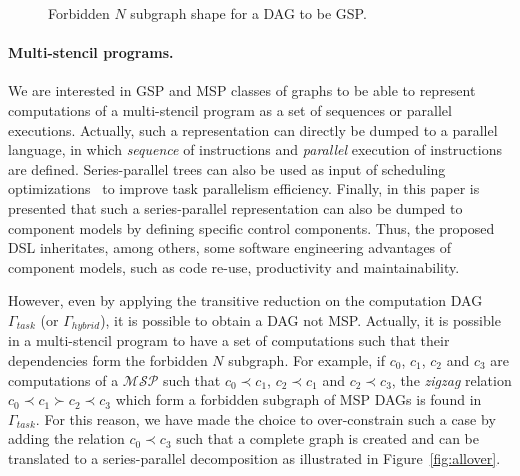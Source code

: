 \begin{figure}[h!]
\begin{center}
  \caption{Forbidden $N$ subgraph shape for a DAG to be GSP.}
  \label{fig:n}
\end{center}
\end{figure}

\paragraph{Multi-stencil programs.}
We are interested in GSP and MSP classes of graphs to be able to represent computations of a multi-stencil program as a set of sequences or parallel executions. Actually, such a representation can directly be dumped to a parallel language, in which \emph{sequence} of instructions and \emph{parallel} execution of instructions are defined. Series-parallel trees can also be used as input of scheduling optimizations~\cite{Finta1996323,Wang20082684} to improve task parallelism efficiency. Finally, in this paper is presented that such a series-parallel representation can also be dumped to component models by defining specific control components. Thus, the proposed DSL inheritates, among others, some software engineering advantages of component models, such as code re-use, productivity and maintainability.

However, even by applying the transitive reduction on the computation DAG $\Gamma_{task}$ (or $\Gamma_{hybrid}$), it is possible to obtain a DAG not MSP. Actually, it is possible in a multi-stencil program to have a set of computations such that their dependencies form the forbidden $N$ subgraph. For example, if $c_0$, $c_1$, $c_2$ and $c_3$ are computations of a $\mathcal{MSP}$ such that $c_0 \prec c_1$, $c_2 \prec c_1$ and $c_2 \prec c_3$, the \emph{zigzag} relation $c_0 \prec c_1 \succ c_2 \prec c_3$ which form a forbidden subgraph of MSP DAGs is found in $\Gamma_{task}$. For this reason, we have made the choice to over-constrain such a case by adding the relation $c_0 \prec c_3$ such that a complete graph is created and can be translated to a series-parallel decomposition as illustrated in Figure~\ref{fig:allover}.

